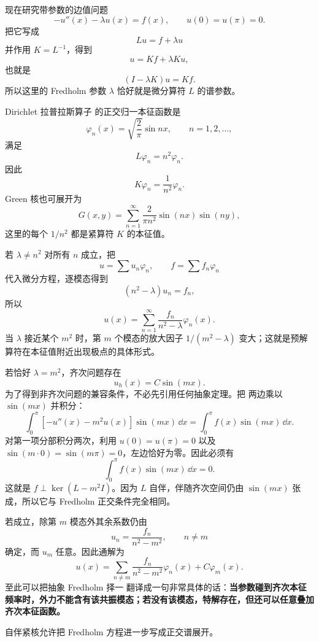 现在研究带参数的边值问题
\begin{equation}
-u''(x)-\lambda u(x)=f(x),
\qquad u(0)=u(\pi)=0.
\label{eq:sturm-liouville-resonance}
\end{equation}
把它写成
\[
Lu=f+\lambda u
\]
并作用 $K=L^{-1}$，得到
\[
u=Kf+\lambda Ku,
\]
也就是
\[
(I-\lambda K)u=Kf.
\]
所以这里的 Fredholm 参数 $\lambda$ 恰好就是微分算符 $L$ 的谱参数。

Dirichlet 拉普拉斯算子 的正交归一本征函数是
\[
\varphi_n(x)=\sqrt{\frac2\pi}\sin nx,
\qquad n=1,2,\dots,
\]
满足
\[
L\varphi_n=n^2\varphi_n.
\]
因此
\[
K\varphi_n=\frac1{n^2}\varphi_n.
\]
Green 核也可展开为
\begin{equation*}G(x,y)
=\sum_{n=1}^\infty
\frac{2}{\pi n^2}
\sin(nx)\sin(ny),\end{equation*}
这里的每个 $1/n^2$ 都是紧算符 $K$ 的本征值。

若 $\lambda\neq n^2$ 对所有 $n$ 成立，把
\[
u=\sum u_n\varphi_n,
\qquad
f=\sum f_n\varphi_n
\]
代入微分方程，逐模态得到
\[
(n^2-\lambda)u_n=f_n,
\]
所以
\begin{equation*}\boxed{
u(x)
=\sum_{n=1}^\infty
\frac{f_n}{n^2-\lambda}\varphi_n(x)
}.\end{equation*}
当 $\lambda$ 接近某个 $m^2$ 时，第 $m$ 个模态的放大因子 $1/(m^2-\lambda)$ 变大；这就是预解算符在本征值附近出现极点的具体形式。

若恰好 $\lambda=m^2$，齐次问题存在
\[
u_h(x)=C\sin(mx).
\]
为了得到非齐次问题的兼容条件，不必先引用任何抽象定理。把 两边乘以 $\sin(mx)$ 并积分：
\[
\int_0^\pi[-u''(x)-m^2u(x)]\sin(mx)\,\dd x
=\int_0^\pi f(x)\sin(mx)\,\dd x.
\]
对第一项分部积分两次，利用 $u(0)=u(\pi)=0$ 以及 $\sin(m\cdot0)=\sin(m\pi)=0$，左边恰好为零。因此必须有
\begin{equation}
\boxed{
\int_0^\pi f(x)\sin(mx)\,\dd x=0
}.
\label{eq:sturm-liouville-compatibility}
\end{equation}
这就是 $f\perp\ker(L-m^2I)$。因为 $L$ 自伴，伴随齐次空间仍由 $\sin(mx)$ 张成，所以它与 Fredholm 正交条件完全相同。

若成立，除第 $m$ 模态外其余系数仍由
\[
u_n=\frac{f_n}{n^2-m^2},
\qquad n\neq m
\]
确定，而 $u_m$ 任意。因此通解为
\[
u(x)
=\sum_{n\neq m}
\frac{f_n}{n^2-m^2}\varphi_n(x)
+C\varphi_m(x).
\]
至此可以把抽象 Fredholm 择一 翻译成一句非常具体的话：\textbf{当参数碰到齐次本征频率时，外力不能含有该共振模态；若没有该模态，特解存在，但还可以任意叠加齐次本征函数。}

自伴紧核允许把 Fredholm 方程进一步写成正交谱展开。

